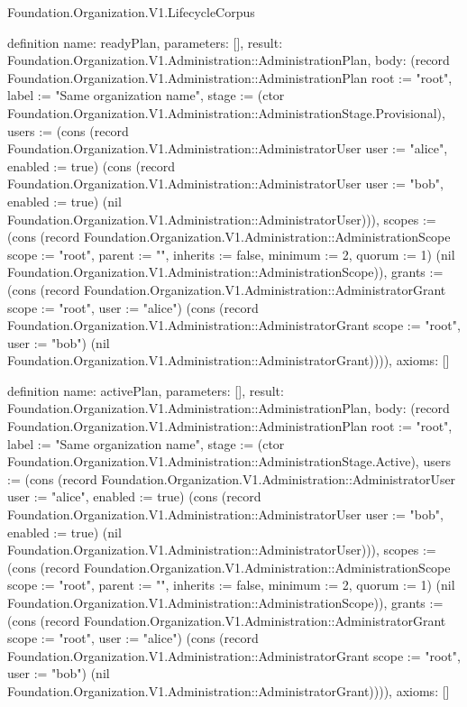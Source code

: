 \begin{lexlean}{Foundation.Organization.V1.LifecycleCorpus}
\begin{semanticmodule}
definition{
  name: readyPlan,
  parameters: [],
  result: Foundation.Organization.V1.Administration::AdministrationPlan,
  body: (record Foundation.Organization.V1.Administration::AdministrationPlan {root := "root", label := "Same organization name", stage := (ctor Foundation.Organization.V1.Administration::AdministrationStage.Provisional), users := (cons (record Foundation.Organization.V1.Administration::AdministratorUser {user := "alice", enabled := true}) (cons (record Foundation.Organization.V1.Administration::AdministratorUser {user := "bob", enabled := true}) (nil Foundation.Organization.V1.Administration::AdministratorUser))), scopes := (cons (record Foundation.Organization.V1.Administration::AdministrationScope {scope := "root", parent := "", inherits := false, minimum := 2, quorum := 1}) (nil Foundation.Organization.V1.Administration::AdministrationScope)), grants := (cons (record Foundation.Organization.V1.Administration::AdministratorGrant {scope := "root", user := "alice"}) (cons (record Foundation.Organization.V1.Administration::AdministratorGrant {scope := "root", user := "bob"}) (nil Foundation.Organization.V1.Administration::AdministratorGrant)))}),
  axioms: []
}

definition{
  name: activePlan,
  parameters: [],
  result: Foundation.Organization.V1.Administration::AdministrationPlan,
  body: (record Foundation.Organization.V1.Administration::AdministrationPlan {root := "root", label := "Same organization name", stage := (ctor Foundation.Organization.V1.Administration::AdministrationStage.Active), users := (cons (record Foundation.Organization.V1.Administration::AdministratorUser {user := "alice", enabled := true}) (cons (record Foundation.Organization.V1.Administration::AdministratorUser {user := "bob", enabled := true}) (nil Foundation.Organization.V1.Administration::AdministratorUser))), scopes := (cons (record Foundation.Organization.V1.Administration::AdministrationScope {scope := "root", parent := "", inherits := false, minimum := 2, quorum := 1}) (nil Foundation.Organization.V1.Administration::AdministrationScope)), grants := (cons (record Foundation.Organization.V1.Administration::AdministratorGrant {scope := "root", user := "alice"}) (cons (record Foundation.Organization.V1.Administration::AdministratorGrant {scope := "root", user := "bob"}) (nil Foundation.Organization.V1.Administration::AdministratorGrant)))}),
  axioms: []
}


\end{semanticmodule}
\end{lexlean}
